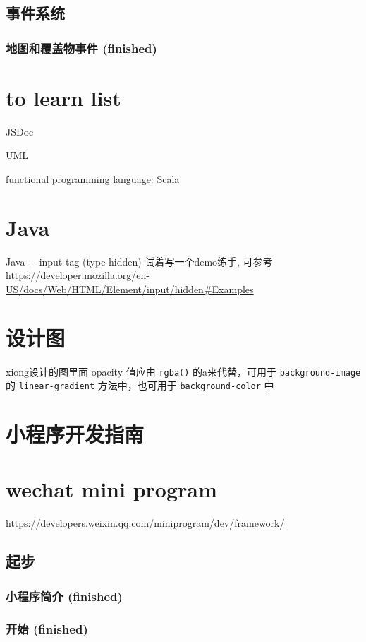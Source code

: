 \documentclass[a4paper, 12pt]{article}
\begin{document}
\subsection{事件系统}
\subsubsection{地图和覆盖物事件 (finished)}


\section{to learn list}
JSDoc

UML

functional programming language: Scala


\section{Java}
Java + input tag (type hidden) 试着写一个demo练手, 可参考 \url{https://developer.mozilla.org/en-US/docs/Web/HTML/Element/input/hidden#Examples}


\section{设计图}
xiong设计的图里面 opacity 值应由 \verb|rgba()| 的a来代替，可用于 \verb|background-image| 的 \verb|linear-gradient| 方法中，也可用于 \verb|background-color| 中


\section{小程序开发指南}


\section{wechat mini program}
\url{https://developers.weixin.qq.com/miniprogram/dev/framework/}

\subsection{起步}
\subsubsection{小程序简介 (finished)}
\subsubsection{开始 (finished)}
\end{document}
